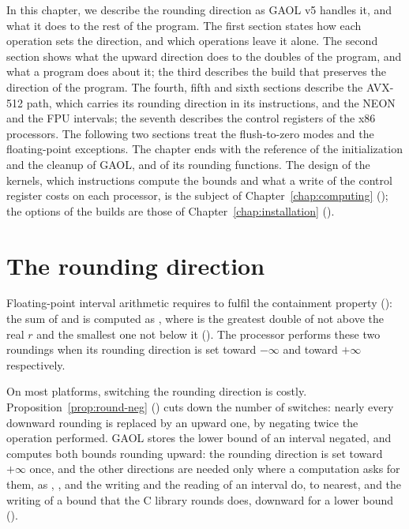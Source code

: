 \medskip
In this chapter, we describe the rounding direction as GAOL v5 handles it,
and what it does to the rest of the program. The first section states how
each operation sets the direction, and which operations leave it alone. The
second section shows what the upward direction does to the doubles of the
program, and what a program does about it; the third describes the build that
preserves the direction of the program. The fourth, fifth and sixth sections
describe the AVX-512 path, which carries its rounding direction in its
instructions, and the NEON and the FPU intervals; the seventh describes the
control registers of the x86 processors. The following two sections
treat the flush-to-zero modes and the
floating-point exceptions. The chapter ends with the reference of the
initialization and the cleanup of GAOL, and of its rounding functions. The
design of the kernels, which instructions compute the bounds and what a write
of the control register costs on each processor, is the subject of
Chapter~\ref{chap:computing} (); the options of the builds
are those of Chapter~\ref{chap:installation} ().

\section{The rounding direction}\label{sec:rounding-direction}
%
%
%
%
%
%
%

Floating-point interval arithmetic requires  to fulfil
the containment property (): the sum of  and
 is computed as , where
 is the greatest double of \FSet{} not above the real $r$ and
 the smallest one not below it (). The
processor performs these two roundings when its rounding direction is set
toward $-\infty$ and toward $+\infty$ respectively.

\medskip
On most platforms, switching the rounding direction is costly.
Proposition~\ref{prop:round-neg} () cuts down the number
of switches: nearly every downward rounding is replaced by an upward one, by
negating twice the operation performed. GAOL stores the lower bound of an
interval negated, and computes both bounds rounding upward: the rounding
direction is set toward $+\infty$ once, and the other directions are needed
only where a computation asks for them, as , , and
the writing and the reading of an interval do, to nearest, and the writing of
a bound that the C library rounds does, downward for a lower bound
().

